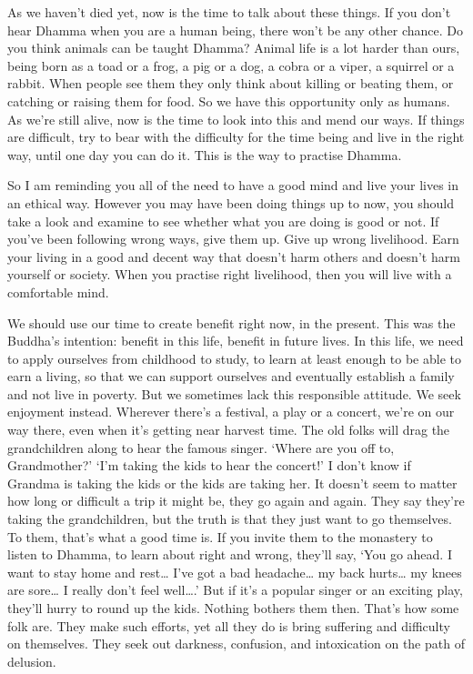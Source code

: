 As we haven't died yet, now is the time to talk about these things. If
you don't hear Dhamma when you are a human being, there won't be any
other chance. Do you think animals can be taught Dhamma? Animal life is
a lot harder than ours, being born as a toad or a frog, a pig or a dog, 
a cobra or a viper, a squirrel or a rabbit. When people see them they
only think about killing or beating them, or catching or raising them
for food. So we have this opportunity only as humans. As we're still
alive, now is the time to look into this and mend our ways. If things
are difficult, try to bear with the difficulty for the time being and
live in the right way, until one day you can do it. This is the way to
practise Dhamma. 

So I am reminding you all of the need to have a good mind and live your
lives in an ethical way. However you may have been doing things up to
now, you should take a look and examine to see whether what you are
doing is good or not. If you've been following wrong ways, give them up. 
Give up wrong livelihood. Earn your living in a good and decent way that
doesn't harm others and doesn't harm yourself or society. When you
practise right livelihood, then you will live with a comfortable mind. 

We should use our time to create benefit right now, in the present. This
was the Buddha's intention: benefit in this life, benefit in future
lives. In this life, we need to apply ourselves from childhood to study, 
to learn at least enough to be able to earn a living, so that we can
support ourselves and eventually establish a family and not live in
poverty. But we sometimes lack this responsible attitude. We seek
enjoyment instead. Wherever there's a festival, a play or a concert, 
we're on our way there, even when it's getting near harvest time. The
old folks will drag the grandchildren along to hear the famous singer. 
`Where are you off to, Grandmother?' `I'm taking the kids to hear the
concert!' I don't know if Grandma is taking the kids or the kids are
taking her. It doesn't seem to matter how long or difficult a trip it
might be, they go again and again. They say they're taking the
grandchildren, but the truth is that they just want to go themselves. To
them, that's what a good time is. If you invite them to the monastery to
listen to Dhamma, to learn about right and wrong, they'll say, `You go
ahead. I want to stay home and rest\ldots{} I've got a bad
headache\ldots{} my back hurts\ldots{} my knees are sore\ldots{} I
really don't feel well\ldots{}.' But if it's a popular singer or an
exciting play, they'll hurry to round up the kids. Nothing bothers them
then. That's how some folk are. They make such efforts, yet all they do
is bring suffering and difficulty on themselves. They seek out darkness, 
confusion, and intoxication on the path of delusion. 

